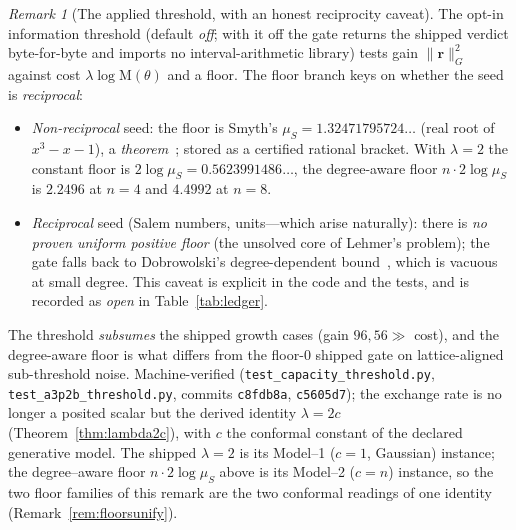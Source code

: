 \documentclass[11pt]{article}
\theoremstyle{plain}
\theoremstyle{definition}
\theoremstyle{remark}
\newtheorem{remark}[theorem]{Remark}
\newcommand{\Mah}{\mathrm{M}}
\newcommand{\rr}{\mathbf{r}}
\newcommand{\GG}{G}
\begin{document}
\begin{remark}[The applied threshold, with an honest reciprocity caveat]\label{rem:threshold}
The opt-in information threshold (default \emph{off}; with it off the gate returns the shipped verdict
byte-for-byte and imports no interval-arithmetic library) tests gain $\lVert\rr\rVert_\GG^2$ against cost
$\lambda\log\Mah(\theta)$ and a floor. The floor branch keys on whether the seed is \emph{reciprocal}:
\begin{itemize}[leftmargin=*]
  \item \emph{Non-reciprocal} seed: the floor is Smyth's $\mu_S=1.32471795724\ldots$ (real root of $x^3-x-1$),
        a \emph{theorem}~\cite{Smyth}; stored as a certified rational bracket. With $\lambda=2$ the constant
        floor is $2\log\mu_S=0.5623991486\ldots$, the degree-aware floor $n\cdot2\log\mu_S$ is $2.2496$ at
        $n=4$ and $4.4992$ at $n=8$.
  \item \emph{Reciprocal} seed (Salem numbers, units---which arise naturally): there is \emph{no proven uniform
        positive floor} (the unsolved core of Lehmer's problem); the gate falls back to Dobrowolski's
        degree-dependent bound~\cite{Dobrowolski}, which is vacuous at small degree. This caveat is explicit
        in the code and the tests, and is recorded as \emph{open} in Table~\ref{tab:ledger}.
\end{itemize}
The threshold \emph{subsumes} the shipped growth cases (gain $96,56\gg$ cost), and the degree-aware floor is
what differs from the floor-$0$ shipped gate on lattice-aligned sub-threshold noise. Machine-verified
(\texttt{test\_capacity\_threshold.py}, \texttt{test\_a3p2b\_threshold.py}, commits \texttt{c8fdb8a},
\texttt{c5605d7}); the exchange rate is no longer a posited scalar but the derived identity $\lambda=2c$
(Theorem~\ref{thm:lambda2c}), with $c$ the conformal constant of the declared generative model. The shipped
$\lambda=2$ is its Model--1 ($c=1$, Gaussian) instance; the degree--aware floor $n\cdot2\log\mu_S$ above is its
Model--2 ($c=n$) instance, so the two floor families of this remark are the two conformal readings of one
identity (Remark~\ref{rem:floorsunify}).
\end{remark}
\end{document}
